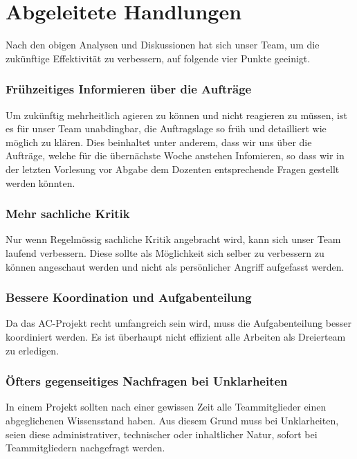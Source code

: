 
\chapter{Abgeleitete Handlungen}

Nach den obigen Analysen und Diskussionen hat sich unser Team, um die zukünftige Effektivität zu verbessern, auf folgende vier Punkte geeinigt.  

\subsection*{Frühzeitiges Informieren über die Aufträge}

Um zukünftig mehrheitlich agieren zu können und nicht reagieren zu müssen, ist es für unser Team unabdingbar, die Auftragslage so früh und detailliert wie möglich zu klären. Dies beinhaltet unter anderem, dass wir uns über die Aufträge, welche für die übernächste Woche anstehen Infomieren, so dass wir in der letzten Vorlesung vor Abgabe dem Dozenten entsprechende Fragen gestellt werden könnten. 

\subsection*{Mehr sachliche Kritik}  

Nur wenn Regelmössig sachliche Kritik angebracht wird, kann sich unser Team laufend verbessern. Diese sollte als Möglichkeit sich selber zu verbessern zu können angeschaut werden und nicht als persönlicher Angriff aufgefasst werden. 

\subsection*{Bessere Koordination und Aufgabenteilung}

Da das AC-Projekt recht umfangreich sein wird, muss die Aufgabenteilung besser koordiniert werden. Es ist überhaupt nicht effizient alle Arbeiten als Dreierteam zu erledigen. 

\subsection*{Öfters gegenseitiges Nachfragen bei Unklarheiten}

In einem Projekt sollten nach einer gewissen Zeit alle Teammitglieder einen abgeglichenen Wissensstand haben. Aus diesem Grund muss bei Unklarheiten, seien diese administrativer, technischer oder inhaltlicher Natur, sofort bei Teammitgliedern nachgefragt werden.


